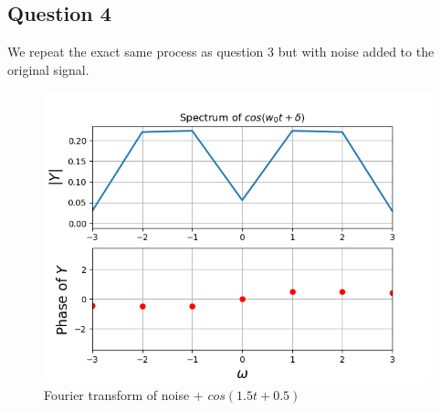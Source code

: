 \documentclass[11pt, a4paper]{article}
\begin{document}
\subsection{Question 4}
We repeat the exact same process as question 3 but with noise added to the original signal.
\begin{figure}[h!]
\centering
\includegraphics[scale=0.6]{fig10.png}
\caption{Fourier transform of noise + $cos(1.5t+0.5)$}
\label{fig:universe}
\end{figure}

\newpage
\end{document}

